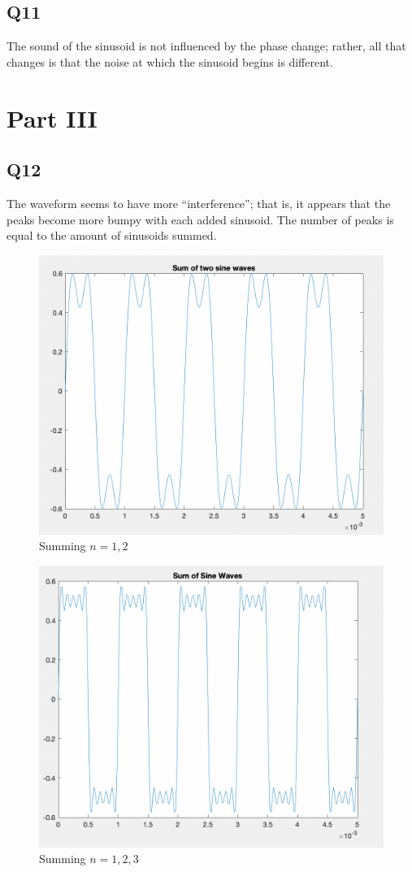 \documentclass[
	letterpaper, %
	10pt, %
]{CSUniSchoolLabReport}
\begin{document}
\subsection{Q11} The sound of the sinusoid is not influenced by the phase change; rather, all that changes is that the noise at which the sinusoid begins is different.

\section{Part III}

\subsection{Q12} The waveform seems to have more ``interference''; that is, it appears that the peaks become more bumpy with each added sinusoid. The number of peaks is equal to the amount of sinusoids summed.

\begin{figure}[H]
  \centering
  \includegraphics[width=.9\textwidth]{Figures/L7Sum1.png}
  \caption{Summing $n=1,2$}
  \label{fig:4}
\end{figure}

\begin{figure}[H]
  \centering
  \includegraphics[width=.9\textwidth]{Figures/L7Sum2.png}
  \caption{Summing $n=1,2,3$}
  \label{fig:5}
\end{figure}
\end{document}
